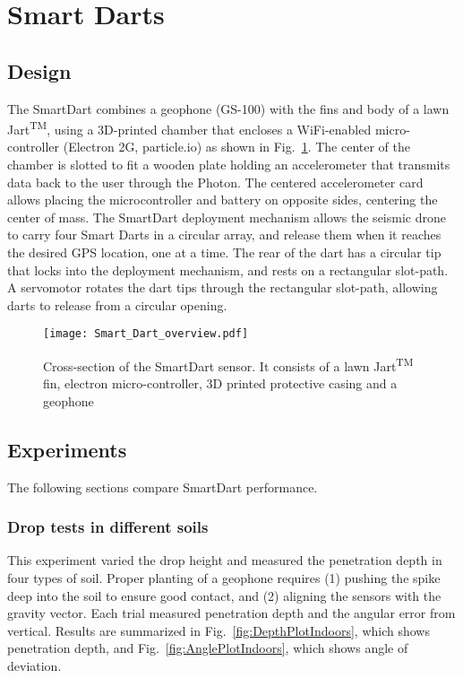 \section{Smart Darts}\label{sec:SmartDarts}

\subsection{Design}

The SmartDart combines a geophone (GS-100) with the fins and body of a lawn Jart\textsuperscript{TM}, using a 3D-printed chamber that encloses a WiFi-enabled micro-controller (Electron 2G, particle.io) as shown in Fig.~\ref{fig:Smart_Dart_overview}. 
The center of the chamber is slotted to fit a wooden plate holding an accelerometer that transmits data back to the user through the Photon. 
The centered accelerometer card allows placing the microcontroller and battery on opposite sides, centering the center of mass.
 The SmartDart deployment mechanism allows the seismic drone to carry four Smart Darts in a circular array, and release them when it reaches the desired GPS location, one at a time. 
 The rear of the dart has a circular tip that locks into the deployment mechanism, and rests on a rectangular slot-path. 
 A servomotor rotates the dart tips through the rectangular slot-path, allowing darts to release from a circular opening.



\begin{figure} \centering
{\texttt{[image: Smart\_Dart\_overview.pdf]}}
\caption{Cross-section of the SmartDart sensor. It consists of a lawn  Jart\textsuperscript{TM} fin, electron micro-controller, 3D printed protective casing and a geophone} 
\label{fig:Smart_Dart_overview}
\end{figure}

\subsection{Experiments}
The following sections compare SmartDart performance.
\subsubsection{ Drop tests in different soils} 
This experiment varied the drop height and measured the penetration depth in four types of soil.
Proper planting of a geophone requires (1) pushing the spike deep into the soil to ensure good contact, and (2) aligning the sensors with the gravity vector.
Each trial measured penetration depth and the angular error from vertical.
Results are summarized in Fig.~\ref{fig:DepthPlotIndoors}, which shows penetration depth, and Fig.~\ref{fig:AnglePlotIndoors}, which shows angle of deviation.

